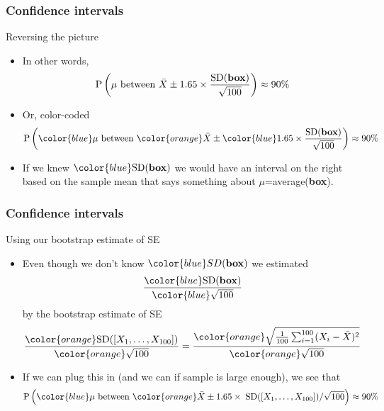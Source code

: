 \documentclass[handout]{beamer}
\begin{document}

   \begin{frame} \frametitle{Confidence intervals}

   \begin{block}
   {Reversing the picture}
   \begin{itemize}
   \item In other words,
   $$
   \begin{aligned}
   \text{P} \left(\text{$\mu$ between $\bar{X} \pm 1.65 \times \frac{\text{SD({\bf box})}}{\sqrt{100}}$} \right) &\approx 90\% \\
   \end{aligned}
   $$
   \item Or, color-coded
   $$
   \begin{aligned}
   \text{P} \left(\text{${\color{blue} \mu}$ between ${\color{orange} \bar{X}} \pm {\color{blue} 1.65 \times \frac{\text{SD({\bf box})}}{\sqrt{100}}}$} \right) &\approx 90\% \\
   \end{aligned}
   $$
   \item If we knew ${\color{blue} \text{SD}({\bf box})}$ we would have an interval on the right based
   on the {\color{orange} sample mean} that says something about
   {\color{blue} $\mu$=average({\bf box})}.
   \end{itemize}
   \end{block}
   \end{frame}


   \begin{frame} \frametitle{Confidence intervals}

   \begin{block}
   {Using our bootstrap estimate of SE}
   \begin{itemize}
   \item Even though we don't know ${\color{blue} SD({\bf box})}$ we estimated
   $$
   \frac{\color{blue} \text{SD}({\bf box})}{{\color{blue} \sqrt{100}}}
   $$
   by the bootstrap estimate of SE
   $$
   \frac{{\color{orange} \text{SD}([X_1, \dots, X_{100}])}}{{\color{orange} \sqrt{100}}} = \frac{{\color{orange} \sqrt{\frac{1}{100}\sum_{i=1}^{100} (X_i - \bar{X})^2}}}{\color{orange} \sqrt{100}}
   $$
   \item If we can plug this in (and we can if sample is large enough), we see that
   $$
   \begin{aligned}
   \text{P} \left(\text{${\color{blue} \mu}$ between ${\color{orange} \bar{X} \pm 1.65 \times \; \text{SD}([X_1, \dots, X_{100}]) / \sqrt{100}}$}\right) &\approx 90\% \\
   \end{aligned}
   $$

   \end{itemize}
   \end{block}
   \end{frame}
\end{document}
